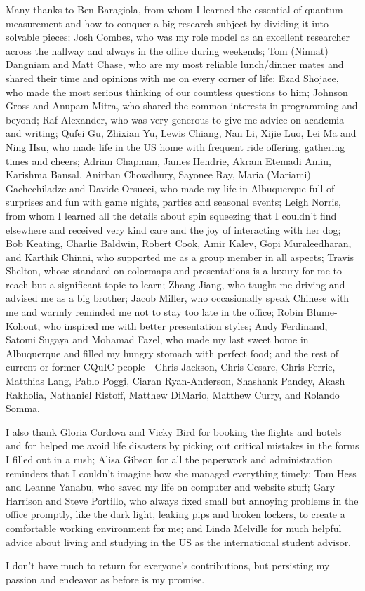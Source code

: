 \begin{acknowledgments}
Many thanks to Ben Baragiola, from whom I learned the essential of quantum measurement and how to conquer a big research subject by dividing it into solvable pieces; Josh Combes, who was my role model as an excellent researcher across the hallway and always in the office during weekends; Tom (Ninnat) Dangniam and Matt Chase, who are my most reliable lunch/dinner mates and shared their time and opinions with me on every corner of life; Ezad Shojaee, who made the most serious thinking of our countless questions to him; Johnson Gross and Anupam Mitra, who shared the common interests in programming and beyond; Raf Alexander, who was very generous to give me advice on academia and writing; Qufei Gu, Zhixian Yu, Lewis Chiang, Nan Li, Xijie Luo, Lei Ma and Ning Hsu, who made life in the US home with frequent ride offering, gathering times and cheers; Adrian Chapman, James Hendrie, Akram Etemadi Amin, Karishma Bansal, Anirban Chowdhury, Sayonee Ray, Maria (Mariami) Gachechiladze and Davide Orsucci, who made my life in Albuquerque full of surprises and fun with game nights, parties and seasonal events; Leigh Norris, from whom I learned all the details about spin squeezing that I couldn't find elsewhere and received very kind care and the joy of interacting with her dog; Bob Keating, Charlie Baldwin, Robert Cook, Amir Kalev, Gopi Muraleedharan, and Karthik Chinni, who supported me as a group member in all aspects; Travis Shelton, whose standard on colormaps and presentations is a luxury for me to reach but a significant topic to learn; Zhang Jiang, who taught me driving and advised me as a big brother; Jacob Miller, who occasionally speak Chinese with me and warmly reminded me not to stay too late in the office; Robin Blume-Kohout, who inspired me with better presentation styles; Andy Ferdinand, Satomi Sugaya and Mohamad Fazel, who made my last sweet home in Albuquerque and filled my hungry stomach with perfect food; and the rest of current or former CQuIC people---Chris Jackson, Chris Cesare, Chris Ferrie, Matthias Lang, Pablo Poggi, Ciaran Ryan-Anderson, Shashank Pandey, Akash Rakholia, Nathaniel Ristoff, Matthew DiMario, Matthew Curry, and Rolando Somma.

I also thank Gloria Cordova and Vicky Bird for booking the flights and hotels and for helped me avoid life disasters by picking out critical mistakes in the forms I filled out in a rush; Alisa Gibson for all the paperwork and administration reminders that I couldn't imagine how she managed everything timely; Tom Hess and Leanne Yanabu, who saved my life on computer and website stuff; Gary Harrison and Steve Portillo, who always fixed small but annoying problems in the office promptly, like the dark light, leaking pips and broken lockers, to create a comfortable working environment for me; and Linda Melville for much helpful advice about living and studying in the \hbox{US} as the international student advisor.

I don't have much to return for everyone's contributions, but persisting my passion and endeavor as before is my promise.
\end{acknowledgments} 